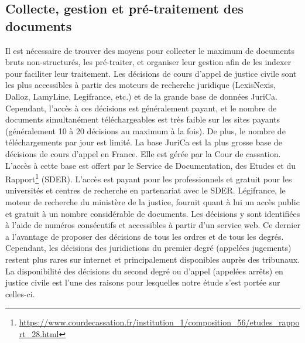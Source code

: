 \subsection{Collecte, gestion et pré-traitement des documents}
Il est nécessaire de trouver des moyens pour collecter le maximum de documents bruts non-structurés, les pré-traiter, et organiser leur gestion afin de les indexer pour faciliter leur traitement. Les décisions de cours d'appel de justice civile sont les plus accessibles à partir des moteurs de recherche juridique (LexisNexis, Dalloz, LamyLine, Legifrance, etc.) et de la grande base de données JuriCa. Cependant, l'accès à ces décisions est généralement payant, et le nombre de documents simultanément téléchargeables est très faible sur les sites payants (généralement 10 à 20 décisions au maximum à la fois). De plus, le nombre de téléchargements par jour est limité. La base JuriCa est la plus grosse base de décisions de cours d'appel en France. Elle est gérée par la Cour de cassation. L'accès à cette base est offert par le Service de Documentation, des Etudes et du Rapport\footnote{\url{https://www.courdecassation.fr/institution_1/composition_56/etudes_rapport_28.html}} (SDER). L'accès est payant pour les professionnels et gratuit pour les universités et centres de recherche en partenariat avec le SDER. Légifrance, le moteur de recherche du ministère de la justice, fournit quant à lui un accès public et gratuit à un nombre considérable de documents. Les décisions y sont identifiées à l'aide de numéros consécutifs et accessibles à partir d'un service web. Ce dernier a l'avantage de proposer des décisions de tous les ordres et de tous les degrés. Cependant, les décisions des juridictions du premier degré (appelées jugements) restent plus rares sur internet et principalement disponibles auprès des tribunaux.  La disponibilité des décisions du second degré ou d'appel (appelées arrêts) en justice civile est l'une des raisons pour lesquelles notre étude s'est portée sur celles-ci.

